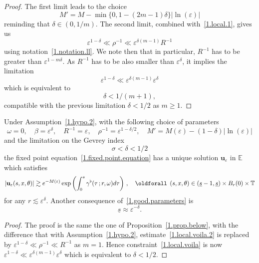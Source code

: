 \documentclass[AHL,Unicode,longabstracts,published]{cedram}
\theoremstyle{plain}
\newcommand*\e{\varepsilon}
\newcommand*\EE{{\mathbb E}}
\newcommand*\g{\gamma}
\newcommand{\ubf}{{\mathbf u}}
\newcommand*\und{\underline}
\renewcommand*{\forall}{\mathrel{\oldforall}}
\begin{document}
\begin{proof}
The first limit leads to the choice
\[
M' = M - \min\{ 0, 1 - (2m-1)\delta \}|\ln(\e)|
\]
reminding that $\delta\in(0,1/m)$. The second limit, combined with~\eqref{1.local.1}, gives us
\begin{equation}\label{1.local.voila.2}
\e^{1-\delta} \ll \rho^{-1} \ll \e^{\delta(m-1)} R^{-1}
\end{equation}
using notation~\eqref{1.notation.ll}. We note then that in particular, $R^{-1}$ has to be greater than $\e^{1-m\delta}$. As $R^{-1}$ has to be also smaller than $\e^{\delta}$, it implies the limitation
\begin{equation}\label{1.local.voila}
\e^{1-\delta} \ll \e^{\delta(m-1)} \e^{\delta}
\end{equation}
which is equivalent to
\[
\delta <1/(m+1),
\]
compatible with the previous limitation $\delta <1/2$ as $m \geq 1$.
\end{proof}


\begin{prop}\label{1.prop.below.bis}
Under Assumption~\ref{1.hypo.2}, with the following choice of parameters
\begin{equation}\label{1.good.parameters.bis}
\omega = 0, \quad \beta = \e^{\delta}, \quad R^{-1} = \e, \quad \rho^{-1} = \e^{1-\delta/2}, \quad M' = M(\e) - (1-\delta)|\ln(\e)|
\end{equation}
and the limitation on the Gevrey index
\[
\sigma < \delta <1/2
\]
the fixed point equation~\eqref{1.fixed.point.equation} has a unique solution $\ubf_{\e}$ in $\EE$ which satisfies
\begin{equation}
|\ubf_{\e}(s,x,\theta)| \gtrsim e^{-M(\e)} \exp \left(\int_{0}^{s} \g^{\flat}(\tau\,; r, \omega) d\tau \right) \,, \quad \forall\,(s,x,\theta)\in(\und{s} - 1, \und{s}) \times B_r(0)\times\mathbb{T}
\end{equation}
for any $r \lesssim \e^{\delta}$. Another consequence of~\eqref{1.good.parameters} is
\begin{equation}
\label{1.final.und.s.bis}
\und{s} \approx \e^{-\delta}.
\end{equation}
\end{prop}

\begin{proof}
The proof is the same the one of Proposition~\ref{1.prop.below}, with the difference that with Assumption~\ref{1.hypo.2}, estimate~\eqref{1.local.voila.2} is replaced by $\e^{1-\delta} \ll \rho^{-1} \ll R^{-1}$ as $m=1$. Hence constraint~\eqref{1.local.voila} is now $ \e^{1-\delta} \ll \e^{\delta(m-1)} \e^{\delta} $ which is equivalent to $\delta <1/2$.
\end{proof}
\end{document}
